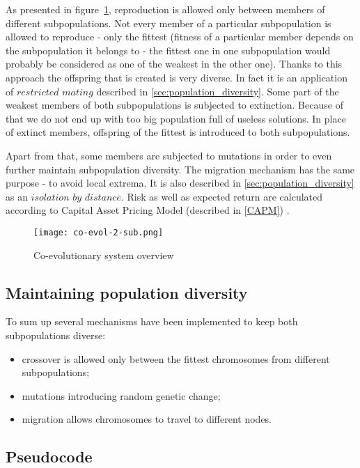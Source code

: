 As presented in figure~\ref{fig:co-evol}, reproduction is allowed only between members of different subpopulations.
Not every member of a particular subpopulation is allowed to reproduce - only the fittest (fitness of a particular member depends on the subpopulation it belongs to - the fittest one
 in one subpopulation would probably be considered as one of the weakest in the other one).
Thanks to this approach the offspring that is created is very diverse.
In fact it is an application of $restricted$ $mating$ described in \ref{sec:population_diversity}. 
Some part of the weakest members of both subpopulations is subjected to extinction.
Because of that we do not end up with too big population full of useless solutions.
In place of extinct members, offspring of the fittest is introduced to both subpopulations.

Apart from that, some members are subjected to mutations in order to even further maintain subpopulation diversity.
The migration mechanism has the same purpose - to avoid local extrema.
It is also described in \ref{sec:population_diversity} as an $isolation$ $by$ $distance$.
Risk as well as expected return are calculated according to Capital Asset Pricing Model (described in \ref{CAPM}) .
 

\begin{figure}[ht]  
	    \begin{center}
	      \texttt{[image: co-evol-2-sub.png]}
	    \end{center}
	    \caption{Co-evolutionary system overview} 
	    \label{fig:co-evol}
	  \end{figure}

\subsection{Maintaining population diversity}

To sum up several mechanisms have been implemented to keep both subpopulations diverse:

\begin{itemize}
  \item crossover is allowed only between the fittest chromosomes from different subpopulations; 
  \item mutations introducing random genetic change;
  \item migration allows chromosomes to travel to different nodes.  
\end{itemize}

\subsection{Pseudocode}

